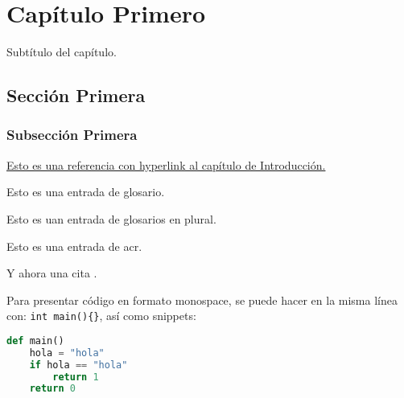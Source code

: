 \chapter{Capítulo Primero}
    Subtítulo del capítulo.
    \section{Sección Primera}
        \lipsum[9]
        \subsection{Subsección Primera}
            \hyperlink{section.1.1}{Esto es una referencia con hyperlink al capítulo de Introducción.}
            
            Esto es una entrada de \gls{glosario}.

            Esto es uan entrada de \glspl{glosario} en plural.
            
            Esto es una entrada de \gls{acr}.

            Y ahora una cita \cite{REF1}.

            Para presentar código en formato monospace, se puede hacer en la misma línea con:
            \lstinline|int main(){}|, así como snippets:
            \begin{lstlisting}[language=Python]
def main()
    hola = "hola"
    if hola == "hola"
        return 1
    return 0            \end{lstlisting}

            \lipsum[15-20]